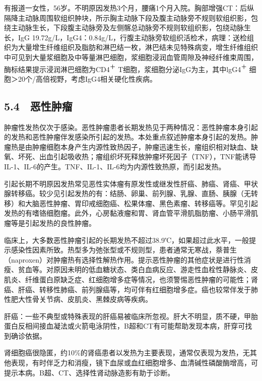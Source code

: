 有报道一女性，56岁。不明原因发热3个月，腰痛1个月入院。胸部增强CT：后纵隔降主动脉周围软组织肿块，所示胸主动脉下段及腹主动脉旁不规则软组织影，包绕主动脉生长，下段腹主动脉旁及左侧髂总动脉旁不规则软组织影，包绕动脉生长，IgG
19.72g/L，IgG4：0.84g/L，行腹主动脉旁软组织活检术，病理：送检组织为大量增生纤维组织及脂肪和淋巴结一枚，淋巴结未见特殊病变，增生纤维组织中可见到大量浆细胞及中等量淋巴细胞，浆细胞浸润血管周隙及神经纤维束周围，酶标结果提示浸润淋巴细胞为CD4\textsuperscript{＋}
T细胞，浆细胞分泌IgG为主，其中lgG4\textsuperscript{＋}
细胞＞20个/高倍视野，考虑IgG4相关硬化性疾病。

\protect\hypertarget{text00036.html}{}{}

\subsection{5.4　恶性肿瘤}

肿瘤性发热仅次于感染。恶性肿瘤患者长期发热见于两种情况：恶性肿瘤本身引起的发热和恶性肿瘤伴发感染所引起的发热。本处重点叙述肿瘤本身引起的发热。肿瘤热是由肿瘤细胞本身产生内源性致热因子，肿瘤迅速生长，瘤组织相对缺血、缺氧、坏死、出血引起吸收热；瘤组织坏死释放肿瘤坏死因子（TNF），TNF能诱导IL-1、IL-6的产生。TNF、IL-1、IL-6均为内源性致热原，而引起发热。

引起长期不明原因发热常见恶性实体瘤有原发性或继发性肝癌、肺癌、肾癌、甲状腺转移癌。较少见引起发热的有：结肠、卵巢、前列腺、乳腺、直肠、胰腺（无转移）和大脑恶性肿瘤、胃印戒细胞癌、松果体瘤、黑色素瘤、转移癌等。罕见引起发热的有嗜铬细胞瘤。此外，心房黏液瘤和胃、肾血管平滑肌脂肪瘤、小肠平滑肌瘤等是引起发热的良性肿瘤。

临床上，大多数恶性肿瘤引起的长期发热不超过38.9℃，如果超过此水平，一般提示感染性因素所致。热型多为弛张型或不规则型，患者通常无寒战，萘普生（naproxen）对肿瘤热有选择性解热作用。提示恶性肿瘤的其他症状是进行性消瘦、贫血等。对原因未明的低血糖状态、类白血病反应、游走性血栓性静脉炎、皮肌炎、纤维蛋白原缺乏症、红细胞增多症等情况，也须警惕恶性肿瘤的可能性；肾癌、肝癌、转移性肺癌、前列腺癌等，均可伴有红细胞增多症。癌也较常伴发于肺性肥大性骨关节病、皮肌炎、黑棘皮病等疾病。

肝癌：一些不典型或特殊表现的肝癌易被临床所忽视。肝大不明显，质不硬，甲胎蛋白反相间接血凝法或火箭电泳阴性，B超和CT有可能帮助发现本病，肝穿可找到确诊依据。

肾细胞癌很隐匿，约10\%的肾癌患者以发热为主要表现，通常仅表现为发热，无其他表现，有时伴乏力和消瘦，镜下血尿或血红细胞增多、血清碱性磷酸酶增高，可提示本病。B超、CT、选择性肾动脉造影有助于诊断。

